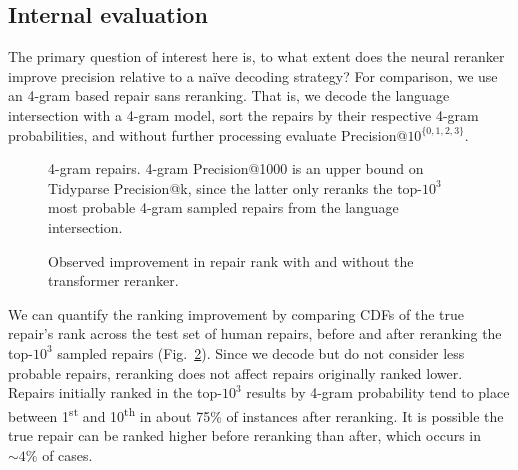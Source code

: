 \documentclass[sigplan,review,acmsmall,nonacm,screen,anonymous]{acmart}\settopmatter{printfolios=false,printccs=false,printacmref=false}
\begin{document}
\clearpage\subsection{Internal evaluation}\label{sec:rq3}

The primary question of interest here is, to what extent does the neural reranker improve precision relative to a na\"ive decoding strategy? For comparison, we use an 4-gram based repair sans reranking. That is, we decode the language intersection with a 4-gram model, sort the repairs by their respective 4-gram probabilities, and without further processing evaluate Precision@$10^{\{0, 1, 2, 3\}}$.\vspace{-0.2cm}
\begin{figure}[H]
\resizebox{.24\textwidth}{!}{}
\resizebox{.24\textwidth}{!}{}
\resizebox{.24\textwidth}{!}{}
\resizebox{.24\textwidth}{!}{}
\caption{4-gram repairs. 4-gram Precision@1000 is an upper bound on Tidyparse Precision@k, since the latter only reranks the top-$10^3$ most probable 4-gram sampled repairs from the language intersection.}\label{fig:adaptive}
\end{figure}\vspace{-0.2cm}

\begin{figure}
\vspace{-0.35cm}
%
%
\resizebox{.45\textwidth}{!}{}
\vspace{-0.8cm}
\caption{Observed improvement in repair rank with and without the transformer reranker.}
\label{fig:rank_cdf}
\vspace{-0.3cm}
\end{figure}

We can quantify the ranking improvement by comparing CDFs of the true repair's rank across the test set of human repairs, before and after reranking the top-$10^3$ sampled repairs (Fig.~\ref{fig:rank_cdf}). Since we decode but do not consider less probable repairs, reranking does not affect repairs originally ranked lower. Repairs initially ranked in the top-$10^3$ results by 4-gram probability tend to place between 1\textsuperscript{st} and 10\textsuperscript{th} in about 75\% of instances after reranking. It is possible the true repair can be ranked higher before reranking than after, which occurs in $\sim4\%$ of cases.
\end{document}
